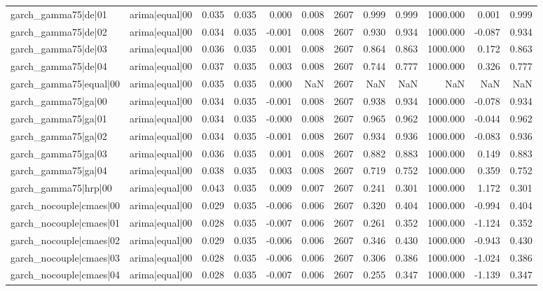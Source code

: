 \begin{table}
\begin{tabular}{llrrrrrrrrrr}
garch\_gamma75|de|01 & arima|equal|00 & 0.035 & 0.035 & 0.000 & 0.008 & 2607 & 0.999 & 0.999 & 1000.000 & 0.001 & 0.999 \\
garch\_gamma75|de|02 & arima|equal|00 & 0.034 & 0.035 & -0.001 & 0.008 & 2607 & 0.930 & 0.934 & 1000.000 & -0.087 & 0.934 \\
garch\_gamma75|de|03 & arima|equal|00 & 0.036 & 0.035 & 0.001 & 0.008 & 2607 & 0.864 & 0.863 & 1000.000 & 0.172 & 0.863 \\
garch\_gamma75|de|04 & arima|equal|00 & 0.037 & 0.035 & 0.003 & 0.008 & 2607 & 0.744 & 0.777 & 1000.000 & 0.326 & 0.777 \\
garch\_gamma75|equal|00 & arima|equal|00 & 0.035 & 0.035 & 0.000 & NaN & 2607 & NaN & NaN & NaN & NaN & NaN \\
garch\_gamma75|ga|00 & arima|equal|00 & 0.034 & 0.035 & -0.001 & 0.008 & 2607 & 0.938 & 0.934 & 1000.000 & -0.078 & 0.934 \\
garch\_gamma75|ga|01 & arima|equal|00 & 0.034 & 0.035 & -0.000 & 0.008 & 2607 & 0.965 & 0.962 & 1000.000 & -0.044 & 0.962 \\
garch\_gamma75|ga|02 & arima|equal|00 & 0.034 & 0.035 & -0.001 & 0.008 & 2607 & 0.934 & 0.936 & 1000.000 & -0.083 & 0.936 \\
garch\_gamma75|ga|03 & arima|equal|00 & 0.036 & 0.035 & 0.001 & 0.008 & 2607 & 0.882 & 0.883 & 1000.000 & 0.149 & 0.883 \\
garch\_gamma75|ga|04 & arima|equal|00 & 0.038 & 0.035 & 0.003 & 0.008 & 2607 & 0.719 & 0.752 & 1000.000 & 0.359 & 0.752 \\
garch\_gamma75|hrp|00 & arima|equal|00 & 0.043 & 0.035 & 0.009 & 0.007 & 2607 & 0.241 & 0.301 & 1000.000 & 1.172 & 0.301 \\
garch\_nocouple|cmaes|00 & arima|equal|00 & 0.029 & 0.035 & -0.006 & 0.006 & 2607 & 0.320 & 0.404 & 1000.000 & -0.994 & 0.404 \\
garch\_nocouple|cmaes|01 & arima|equal|00 & 0.028 & 0.035 & -0.007 & 0.006 & 2607 & 0.261 & 0.352 & 1000.000 & -1.124 & 0.352 \\
garch\_nocouple|cmaes|02 & arima|equal|00 & 0.029 & 0.035 & -0.006 & 0.006 & 2607 & 0.346 & 0.430 & 1000.000 & -0.943 & 0.430 \\
garch\_nocouple|cmaes|03 & arima|equal|00 & 0.028 & 0.035 & -0.006 & 0.006 & 2607 & 0.306 & 0.386 & 1000.000 & -1.024 & 0.386 \\
garch\_nocouple|cmaes|04 & arima|equal|00 & 0.028 & 0.035 & -0.007 & 0.006 & 2607 & 0.255 & 0.347 & 1000.000 & -1.139 & 0.347 \\

\end{tabular}
\end{table}
